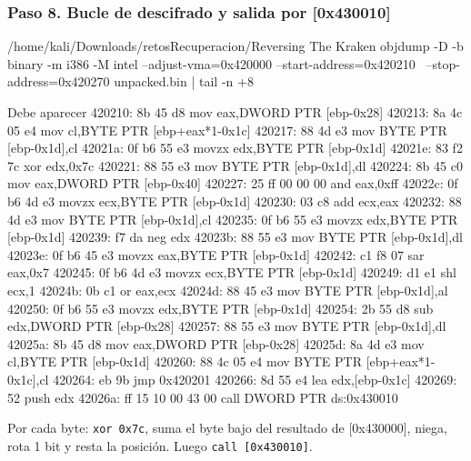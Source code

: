 \documentclass[11pt,a4paper]{article}
\begin{document}
\subsubsection*{Paso 8. Bucle de descifrado y salida por [0x430010]}
\begin{comando}{/home/kali/Downloads/retosRecuperacion/Reversing The Kraken}
objdump -D -b binary -m i386 -M intel --adjust-vma=0x420000 --start-address=0x420210 \
  --stop-address=0x420270 unpacked.bin | tail -n +8
\end{comando}
\begin{salida}{Debe aparecer}
  420210:       8b 45 d8                mov    eax,DWORD PTR [ebp-0x28]
  420213:       8a 4c 05 e4             mov    cl,BYTE PTR [ebp+eax*1-0x1c]
  420217:       88 4d e3                mov    BYTE PTR [ebp-0x1d],cl
  42021a:       0f b6 55 e3             movzx  edx,BYTE PTR [ebp-0x1d]
  42021e:       83 f2 7c                xor    edx,0x7c
  420221:       88 55 e3                mov    BYTE PTR [ebp-0x1d],dl
  420224:       8b 45 c0                mov    eax,DWORD PTR [ebp-0x40]
  420227:       25 ff 00 00 00          and    eax,0xff
  42022c:       0f b6 4d e3             movzx  ecx,BYTE PTR [ebp-0x1d]
  420230:       03 c8                   add    ecx,eax
  420232:       88 4d e3                mov    BYTE PTR [ebp-0x1d],cl
  420235:       0f b6 55 e3             movzx  edx,BYTE PTR [ebp-0x1d]
  420239:       f7 da                   neg    edx
  42023b:       88 55 e3                mov    BYTE PTR [ebp-0x1d],dl
  42023e:       0f b6 45 e3             movzx  eax,BYTE PTR [ebp-0x1d]
  420242:       c1 f8 07                sar    eax,0x7
  420245:       0f b6 4d e3             movzx  ecx,BYTE PTR [ebp-0x1d]
  420249:       d1 e1                   shl    ecx,1
  42024b:       0b c1                   or     eax,ecx
  42024d:       88 45 e3                mov    BYTE PTR [ebp-0x1d],al
  420250:       0f b6 55 e3             movzx  edx,BYTE PTR [ebp-0x1d]
  420254:       2b 55 d8                sub    edx,DWORD PTR [ebp-0x28]
  420257:       88 55 e3                mov    BYTE PTR [ebp-0x1d],dl
  42025a:       8b 45 d8                mov    eax,DWORD PTR [ebp-0x28]
  42025d:       8a 4d e3                mov    cl,BYTE PTR [ebp-0x1d]
  420260:       88 4c 05 e4             mov    BYTE PTR [ebp+eax*1-0x1c],cl
  420264:       eb 9b                   jmp    0x420201
  420266:       8d 55 e4                lea    edx,[ebp-0x1c]
  420269:       52                      push   edx
  42026a:       ff 15 10 00 43 00       call   DWORD PTR ds:0x430010
\end{salida}
\begin{nota}Por cada byte: \texttt{xor 0x7c}, suma el byte bajo del resultado de [0x430000], niega, rota 1 bit y resta la posición. Luego \texttt{call [0x430010]}.\end{nota}
\end{document}
